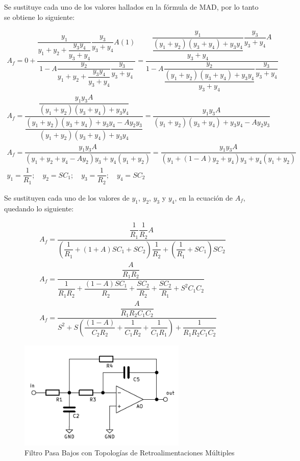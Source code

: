 \begin{enumerate}
            Se sustituye cada uno de los valores hallados en la fórmula de MAD, por lo tanto se obtiene lo siguiente:

            \begin{gather}
                A_f=0+\dfrac{\dfrac{y_1}{y_1+y_2+\dfrac{y_3y_4}{y_3+y_4}}\dfrac{y_3}{y_3+y_4}A(1)}{1-A\dfrac{y_2}{y_1+y_2+\dfrac{y_3y_4}{y_3+y_4}}\dfrac{y_3}{y_3+y_4}}=\dfrac{\dfrac{y_1}{\dfrac{(y_1+y_2)(y_3+y_4)+y_3y_4}{y_3+y_4}}\dfrac{y_3}{y_3+y_4}A}{1-A\dfrac{y_2}{\dfrac{(y_1+y_2)(y_3+y_4)+y_3y_4}{y_3+y_4}}\dfrac{y_3}{y_3+y_4}} \nonumber\\[0.5cm]
                A_f=\dfrac{\dfrac{y_1y_3A}{(y_1+y_2)(y_3+y_4)+y_3y_4}}{\dfrac{(y_1+y_2)(y_3+y_4)+y_3y_4-Ay_2y_3}{(y_1+y_2)(y_3+y_4)+y_3y_4}}=\dfrac{y_1y_3A}{(y_1+y_2)(y_3+y_4)+y_3y_4-Ay_2y_3}\nonumber\\[0.5cm]
                A_f=\dfrac{y_1y_3A}{(y_1+y_2+y_4-Ay_2)y_3+y_4(y_1+y_2)}=\dfrac{y_1y_3A}{(y_1+(1-A)y_2+y_4)y_3+y_4(y_1+y_2)}\nonumber\\[0.5cm]
                y_1=\dfrac{1}{R_1}; \quad y_2=SC_1; \quad y_3= \dfrac{1}{R_2}; \quad y_4=SC_2 \nonumber
            \end{gather}

            Se sustituyen cada uno de los valores de $y_1$, $y_2$, $y_3$ y $y_4$, en la ecuación de $A_f$, quedando lo siguiente:

            \begin{gather}
                A_f=\dfrac{\dfrac{1}{R_1}\dfrac{1}{R_2}A}{\left(\dfrac{1}{R_1}+(1+A)SC_1+SC_2\right)\dfrac{1}{R_2}+\left(\dfrac{1}{R_1}+SC_1\right)SC_2}\nonumber\\[0.5cm]
                A_f=\dfrac{\dfrac{A}{R_1R_2}}{\dfrac{1}{R_1R_2}+\dfrac{(1-A)SC_1}{R_2}+\dfrac{SC_2}{R_2}+\dfrac{SC_2}{R_1}+S^2C_1C_2}\nonumber\\[0.5cm]
                A_f=\dfrac{\dfrac{A}{R_1R_2C_1C_2}}{S^2+S\left(\dfrac{(1-A)}{C_2R_2}+\dfrac{1}{C_1R_2}+\dfrac{1}{C_1R_1}\right)+\dfrac{1}{R_1R_2C_1C_2}}\label{eqn:5}
            \end{gather}

\newpage
            \begin{figure}[H]
                  \centering
                  \includegraphics[width=8cm]{Imagenes/retro_multiples.png}
                  \caption{Filtro Pasa Bajos con Topologías de Retroalimentaciones Múltiples}
                  \label{fig:retro_multiples}
            \end{figure}


\end{enumerate}
